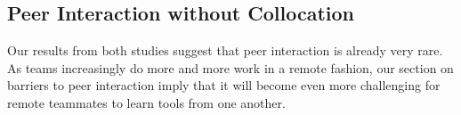 \documentclass[smallextended]{svjour3}
\newcommand\discovery{peer interaction\xspace}
\newcommand\DisCovery{Peer Interaction\xspace}
\begin{document}
% 
% 
% 
% 

\subsection{\DisCovery without Collocation}

\noindent
Our results from both studies suggest that \discovery is already
very rare.
As teams increasingly do more and more work in a remote fashion,
our section on barriers to \discovery imply that
it will become even more challenging for remote teammates to learn
tools from one another.
\end{document}
